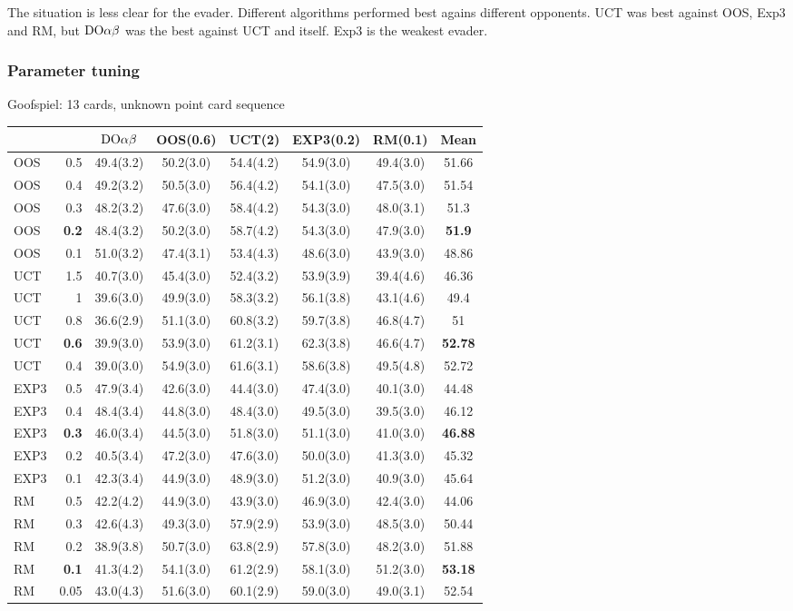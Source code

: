 The situation is less clear for the evader. Different algorithms performed best agains different opponents.
UCT was best against OOS, Exp3 and RM, but $\textrm{DO}\alpha\beta$ was the best against UCT and itself.
Exp3 is the weakest evader.

\subsubsection{Parameter tuning}\label{sec:eval:online:tuning}

\begin{table}
\centering
\begin{scriptsize}

Goofspiel: 13 cards, unknown point card sequence
\begin{tabular}{|lr|ccccc|c|}\hline
&&$\textrm{DO}\alpha\beta$&OOS(0.6)&UCT(2)&EXP3(0.2)&RM(0.1)&Mean\\\hline
OOS&0.5&49.4(3.2)&50.2(3.0)&54.4(4.2)&54.9(3.0)&49.4(3.0)&51.66\\
OOS&0.4&49.2(3.2)&50.5(3.0)&56.4(4.2)&54.1(3.0)&47.5(3.0)&51.54\\
OOS&0.3&48.2(3.2)&47.6(3.0)&58.4(4.2)&54.3(3.0)&48.0(3.1)&51.3\\
OOS&\textbf{0.2}&48.4(3.2)&50.2(3.0)&58.7(4.2)&54.3(3.0)&47.9(3.0)&\textbf{51.9}\\
OOS&0.1&51.0(3.2)&47.4(3.1)&53.4(4.3)&48.6(3.0)&43.9(3.0)&48.86\\
UCT&1.5&40.7(3.0)&45.4(3.0)&52.4(3.2)&53.9(3.9)&39.4(4.6)&46.36\\
UCT&1&39.6(3.0)&49.9(3.0)&58.3(3.2)&56.1(3.8)&43.1(4.6)&49.4\\
UCT&0.8&36.6(2.9)&51.1(3.0)&60.8(3.2)&59.7(3.8)&46.8(4.7)&51\\
UCT&\textbf{0.6}&39.9(3.0)&53.9(3.0)&61.2(3.1)&62.3(3.8)&46.6(4.7)&\textbf{52.78}\\
UCT&0.4&39.0(3.0)&54.9(3.0)&61.6(3.1)&58.6(3.8)&49.5(4.8)&52.72\\
EXP3&0.5&47.9(3.4)&42.6(3.0)&44.4(3.0)&47.4(3.0)&40.1(3.0)&44.48\\
EXP3&0.4&48.4(3.4)&44.8(3.0)&48.4(3.0)&49.5(3.0)&39.5(3.0)&46.12\\
EXP3&\textbf{0.3}&46.0(3.4)&44.5(3.0)&51.8(3.0)&51.1(3.0)&41.0(3.0)&\textbf{46.88}\\
EXP3&0.2&40.5(3.4)&47.2(3.0)&47.6(3.0)&50.0(3.0)&41.3(3.0)&45.32\\
EXP3&0.1&42.3(3.4)&44.9(3.0)&48.9(3.0)&51.2(3.0)&40.9(3.0)&45.64\\
RM&0.5&42.2(4.2)&44.9(3.0)&43.9(3.0)&46.9(3.0)&42.4(3.0)&44.06\\
RM&0.3&42.6(4.3)&49.3(3.0)&57.9(2.9)&53.9(3.0)&48.5(3.0)&50.44\\
RM&0.2&38.9(3.8)&50.7(3.0)&63.8(2.9)&57.8(3.0)&48.2(3.0)&51.88\\
RM&\textbf{0.1}&41.3(4.2)&54.1(3.0)&61.2(2.9)&58.1(3.0)&51.2(3.0)&\textbf{53.18}\\
RM&0.05&43.0(4.3)&51.6(3.0)&60.1(2.9)&59.0(3.0)&49.0(3.1)&52.54\\
\hline
\end{tabular}


\end{scriptsize}
\end{table}
